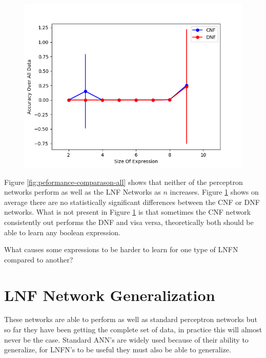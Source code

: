\begin{figure}[H]
  \centering
  \begin{minipage}[b]{0.8\textwidth}
    \includegraphics[width=\textwidth]{CNFvsDNF.png}
    \caption{}
    \label{fig:peformance-comparason-cnfdnf}
  \end{minipage}
  \hfill
\end{figure}

Figure  \ref{fig:peformance-comparason-all} shows that neither of the perceptron networks perform as well as the LNF Networks as $n$ increases. Figure  \ref{fig:peformance-comparason-cnfdnf} shows on average there are no statistically significant differences between the CNF or DNF networks. What is not present in Figure \ref{fig:peformance-comparason-cnfdnf} is that sometimes the CNF network consistently out performs the DNF and visa versa, theoretically both should be able to learn any boolean expression.

What causes some expressions to be harder to learn for one type of LNFN compared to another? 

\section{LNF Network Generalization} \label{sec:lnfn-generalization}
These networks are able to perform as well as standard perceptron networks but so far they have been getting the complete set of data, in practice this will almost never be the case. Standard ANN's are widely used because of their ability to generalize, for LNFN's to be useful they must also be able to generalize.

